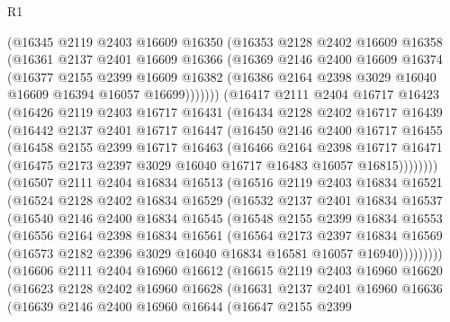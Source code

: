 \begin{lexlean}{R1}
\begin{coremodule}
      (@16345
        @2119
        @2403
        @16609
        @16350
        (@16353
          @2128
          @2402
          @16609
          @16358
          (@16361
            @2137
            @2401
            @16609
            @16366
            (@16369
              @2146
              @2400
              @16609
              @16374
              (@16377
                @2155
                @2399
                @16609
                @16382
                (@16386 @2164 @2398 @3029 @16040 @16609 @16394 @16057 @16699)))))))
    (@16417
      @2111
      @2404
      @16717
      @16423
      (@16426
        @2119
        @2403
        @16717
        @16431
        (@16434
          @2128
          @2402
          @16717
          @16439
          (@16442
            @2137
            @2401
            @16717
            @16447
            (@16450
              @2146
              @2400
              @16717
              @16455
              (@16458
                @2155
                @2399
                @16717
                @16463
                (@16466
                  @2164
                  @2398
                  @16717
                  @16471
                  (@16475 @2173 @2397 @3029 @16040 @16717 @16483 @16057 @16815))))))))
    (@16507
      @2111
      @2404
      @16834
      @16513
      (@16516
        @2119
        @2403
        @16834
        @16521
        (@16524
          @2128
          @2402
          @16834
          @16529
          (@16532
            @2137
            @2401
            @16834
            @16537
            (@16540
              @2146
              @2400
              @16834
              @16545
              (@16548
                @2155
                @2399
                @16834
                @16553
                (@16556
                  @2164
                  @2398
                  @16834
                  @16561
                  (@16564
                    @2173
                    @2397
                    @16834
                    @16569
                    (@16573 @2182 @2396 @3029 @16040 @16834 @16581 @16057 @16940)))))))))
    (@16606
      @2111
      @2404
      @16960
      @16612
      (@16615
        @2119
        @2403
        @16960
        @16620
        (@16623
          @2128
          @2402
          @16960
          @16628
          (@16631
            @2137
            @2401
            @16960
            @16636
            (@16639
              @2146
              @2400
              @16960
              @16644
              (@16647
                @2155
                @2399

\end{coremodule}
\end{lexlean}
